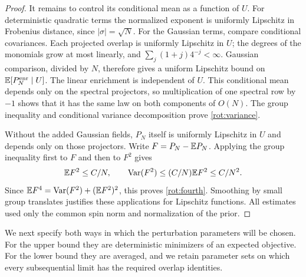 \begin{proof}
It remains to control its conditional mean as a function of \(U\).
For deterministic quadratic terms the normalized exponent is
uniformly Lipschitz in Frobenius distance, since
\(|\sigma|=\sqrt N\).  For the Gaussian terms, compare conditional
covariances.  Each projected overlap is uniformly Lipschitz in \(U\);
the degrees of the monomials grow at most linearly, and
\(\sum_j(1+j)4^{-j}<\infty\).  Gaussian comparison, divided by \(N\),
therefore gives a uniform Lipschitz bound on
\(\mathbb E[P_N^{\mathrm{enr}}\mid U]\).  The linear enrichment is independent
of \(U\).  This conditional mean depends only on the spectral
projectors, so multiplication of one spectral row by \(-1\) shows
that it has the same law on both components of \(O(N)\).
The group inequality and conditional variance decomposition prove
\eqref{rot:variance}.

Without the added Gaussian fields, \(P_N\) itself is uniformly
Lipschitz in \(U\) and depends only on those projectors.  Write
\(F=P_N-\mathbb E P_N\).  Applying the group inequality first to \(F\) and
then to \(F^2\) gives
\[
 \mathbb E F^2\le C/N,\qquad
 \operatorname{Var}(F^2)\le (C/N)\mathbb E F^2\le C/N^2.
\]
Since \(\mathbb E F^4=\operatorname{Var}(F^2)+(\mathbb E F^2)^2\), this proves
\eqref{rot:fourth}.  Smoothing by small group translates justifies
these applications for Lipschitz functions.  All estimates used only
the common spin norm and normalization of the prior.
\end{proof}

We next specify both ways in which the perturbation parameters will
be chosen.  For the upper bound they are deterministic minimizers of
an expected objective.  For the lower bound they are averaged, and we
retain parameter sets on which every subsequential limit has the
required overlap identities.

